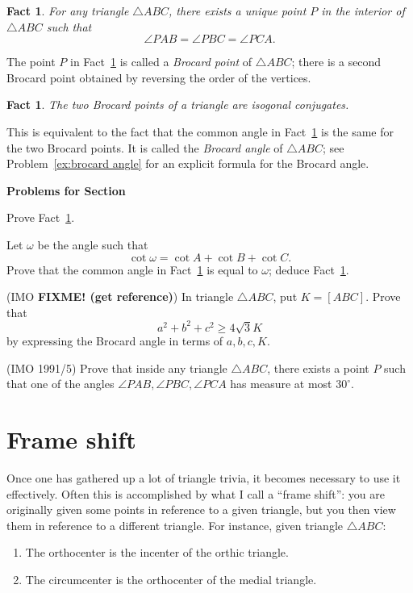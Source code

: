 \documentclass[12pt]{book}
\newcounter{exc}
\numberwithin{exc}{section}
\numberwithin{figure}{section}
\newenvironment{exer}{\vspace{0.1in}
\noindent \textbf{Problems for Section~\thesection} \vspace{0.1in}
\begin{list}{\arabic{exc}.}{\usecounter{exc}}}{\end{list}}
\newtheorem{fact}[theorem]{Fact}
\numberwithin{equation}{theorem}
\def\ii{\item}
\def\ang{\angle}
\def\fixme#1{\textbf{FIXME! (#1)}}
\begin{document}
\begin{fact} \label{fact:brocard}
For any triangle $\triangle ABC$, there exists a unique point $P$ in
the interior of $\triangle ABC$ such that
\[
\angle PAB = \angle PBC = \angle PCA.
\]
\end{fact}
The point $P$ in Fact~\ref{fact:brocard}
is called a \emph{Brocard point} 
of $\triangle ABC$; there is a second
Brocard point obtained by reversing the order of the vertices.

\begin{fact} \label{fact:brocard2}
The two Brocard points of a triangle are isogonal conjugates.
\end{fact}
This is equivalent to the fact that the common angle in
Fact~\ref{fact:brocard} is the same for the two Brocard points. It
is called the \emph{Brocard angle} 
of $\triangle ABC$; see Problem~\ref{ex:brocard angle} for an explicit
formula for the Brocard angle.

\begin{exer}
\ii \label{ex:broc1}
Prove Fact~\ref{fact:brocard}.

\ii \label{ex:brocard angle}
Let $\omega$ be the angle such that
\[
\cot \omega = \cot A + \cot B + \cot C.
\]
Prove that the common angle in Fact~\ref{fact:brocard} is equal to $\omega$;
deduce Fact~\ref{fact:brocard2}.

\ii (IMO \fixme{get reference})
In triangle $\triangle ABC$, put $K = [ABC]$. Prove that
\[
a^{2} + b^{2} + c^{2} \geq 4\sqrt{3}K
\]
by expressing the Brocard angle in terms of $a,b,c,K$.

\ii \label{ex:imo91}
(IMO 1991/5)
Prove that inside any triangle $\triangle 
ABC$, there exists a point $P$ such that 
one of the angles $\ang PAB, \ang PBC, \ang PCA$ has measure at most 
$30^{\circ}$.
\end{exer}

\section{Frame shift}

Once one has gathered up a lot of triangle trivia, it becomes necessary
to use it effectively. Often this is accomplished by what I call a
``frame shift'': you are originally given some points in reference to
a given triangle, but you then view them in reference to a different triangle.
For instance, given triangle $\triangle ABC$:
\begin{enumerate}
\item The orthocenter is the incenter of the orthic triangle.
\item The circumcenter is the orthocenter of the medial triangle.
\end{enumerate}
\end{document}
